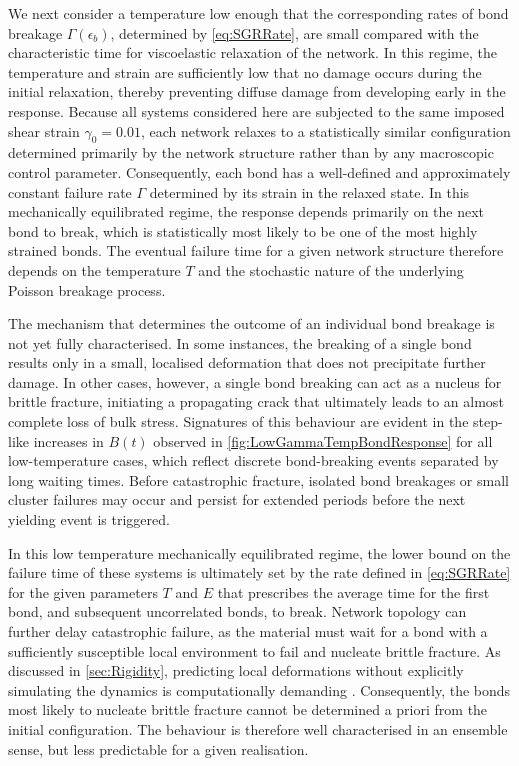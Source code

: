 \documentclass[asymmetricmargins]{library/duthesis}%
\begin{document}
We next consider a temperature low enough that the corresponding rates of bond breakage $\Gamma(\epsilon_b)$, determined by \cref{eq:SGRRate}, are small compared with the characteristic time for viscoelastic relaxation of the network. In this regime, the temperature and strain are sufficiently low that no damage occurs during the initial relaxation, thereby preventing diffuse damage from developing early in the response. Because all systems considered here are subjected to the same imposed shear strain $\gamma_0=0.01$, each network relaxes to a statistically similar configuration determined primarily by the network structure rather than by any macroscopic control parameter. Consequently, each bond has a well-defined and approximately constant failure rate $\Gamma$ determined by its strain in the relaxed state. In this mechanically equilibrated regime, the response depends primarily on the next bond to break, which is statistically most likely to be one of the most highly strained bonds. The eventual failure time for a given network structure therefore depends on the temperature $T$ and the stochastic nature of the underlying Poisson breakage process.

The mechanism that determines the outcome of an individual bond breakage is not yet fully characterised. In some instances, the breaking of a single bond results only in a small, localised deformation that does not precipitate further damage. In other cases, however, a single bond breaking can act as a nucleus for brittle fracture, initiating a propagating crack that ultimately leads to an almost complete loss of bulk stress. Signatures of this behaviour are evident in the step-like increases in $B(t)$ observed in \cref{fig:LowGammaTempBondResponse} for all low-temperature cases, which reflect discrete bond-breaking events separated by long waiting times. Before catastrophic fracture, isolated bond breakages or small cluster failures may occur and persist for extended periods before the next yielding event is triggered.

In this low temperature mechanically equilibrated regime, the lower bound on the failure time of these systems is ultimately set by the rate defined in \cref{eq:SGRRate} for the given parameters $T$ and $E$ that prescribes the average time for the first bond, and subsequent uncorrelated bonds, to break. Network topology can further delay catastrophic failure, as the material must wait for a bond with a sufficiently susceptible local environment to fail and nucleate brittle fracture. As discussed in \cref{sec:Rigidity}, predicting local deformations without explicitly simulating the dynamics is computationally demanding \cite{damavandi_energetic_2022,damavandi_energetic_2022-1}. Consequently, the bonds most likely to nucleate brittle fracture cannot be determined a priori from the initial configuration. The behaviour is therefore well characterised in an ensemble sense, but less predictable for a given realisation.
\end{document}
